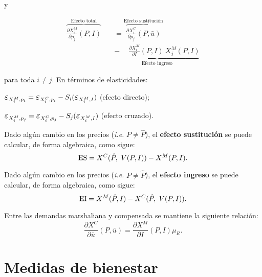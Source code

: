\documentclass[8pt,a4paper]{extarticle}
\begin{document}
\begin{multicols}{3}
\begin{boxtheo}[Ecuación de Slutsky]
	y
	
	\begin{equation*}
	\begin{aligned}
		\overbrace{\frac{\partial X^M_i}{\partial p_j} (P, I)}^{\text{Efecto total}} \quad &= \overbrace{\frac{\partial X^C_i}{\partial p_j} (P, \bar{u})}^{\text{Efecto sustitución}} \\
		& \underbrace{ - \quad\ \frac{\partial X_i^M}{\partial I} (P, I)\ X^M_j (P,I)}_{\text{Efecto ingreso}}
	\end{aligned}
	\end{equation*} 

	para toda $i \neq j$. En términos de elasticidades:

	\begin{eqlist}
	\item $\E_{X_i^M, p_i} = \E_{X_i^C, p_i} - S_i ( \E_{X_i^M, I})$ (efecto directo);
	\item $\E_{X_i^M, p_j} = \E_{X_i^C, p_j} - S_j ( \E_{X_i^M, I})$ (efecto cruzado).
	\end{eqlist}

\end{boxtheo}

\begin{boxdef}
	Dado algún cambio en los precios (\emph{i.e.} $P \neq \hat{P}$), el \textbf{efecto sustitución} se puede calcular, de forma algebraica, como sigue:
	\[
	\text{\normalfont ES} = X^C (\hat{P},\ V(P, I)) - X^M(P, I)
	.\] 
\end{boxdef}

\begin{boxdef}
	Dado algún cambio en los precios (\emph{i.e.} $P \neq \hat{P}$), el \textbf{efecto ingreso} se puede calcular, de forma algebraica, como sigue:
	\[
		\text{\normalfont EI} = X^M(\hat{P}, I) - X^C(\hat{P},\ V(P, I))
	.\] 
\end{boxdef}

\begin{boxtheo}
	Entre las demandas marshaliana y compensada se mantiene la siguiente relación:
	\[
		\frac{\partial X^C}{\partial \bar{u}} (P, \bar{u}) = \frac{\partial X^M}{\partial I} (P, I) \mu_R
	.\] 
\end{boxtheo}

\newpage

\section{Medidas de bienestar}


\end{multicols}
\end{document}
